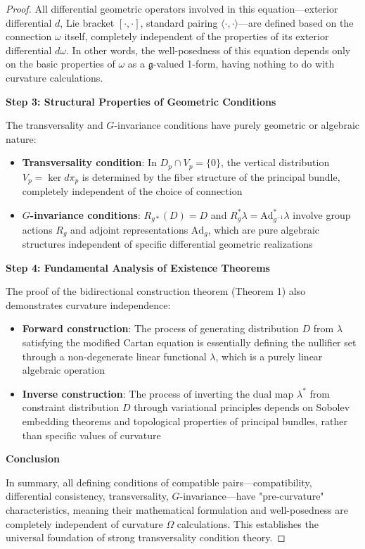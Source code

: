 \documentclass[a4paper,12pt]{extarticle}
\theoremstyle{definition}
\begin{document}
\begin{proof}
All differential geometric operators involved in this equation—exterior differential $d$, Lie bracket $[\cdot, \cdot]$, standard pairing $\langle \cdot, \cdot \rangle$—are defined based on the connection $\omega$ itself, completely independent of the properties of its exterior differential $d\omega$. In other words, the well-posedness of this equation depends only on the basic properties of $\omega$ as a $\mathfrak{g}$-valued 1-form, having nothing to do with curvature calculations.

\textbf{Step 3: Structural Properties of Geometric Conditions}

The transversality and $G$-invariance conditions have purely geometric or algebraic nature:
\begin{itemize}
\item \textbf{Transversality condition}: In $D_p \cap V_p = \{0\}$, the vertical distribution $V_p = \ker d\pi_p$ is determined by the fiber structure of the principal bundle, completely independent of the choice of connection
\item \textbf{$G$-invariance conditions}: $R_{g*}(D) = D$ and $R_g^* \lambda = \text{Ad}_{g^{-1}}^* \lambda$ involve group actions $R_g$ and adjoint representations $\text{Ad}_g$, which are pure algebraic structures independent of specific differential geometric realizations
\end{itemize}

\textbf{Step 4: Fundamental Analysis of Existence Theorems}

The proof of the bidirectional construction theorem (Theorem 1) also demonstrates curvature independence:
\begin{itemize}
\item \textbf{Forward construction}: The process of generating distribution $D$ from $\lambda$ satisfying the modified Cartan equation is essentially defining the nullifier set through a non-degenerate linear functional $\lambda$, which is a purely linear algebraic operation
\item \textbf{Inverse construction}: The process of inverting the dual map $\lambda^*$ from constraint distribution $D$ through variational principles depends on Sobolev embedding theorems and topological properties of principal bundles, rather than specific values of curvature
\end{itemize}

\textbf{Conclusion}

In summary, all defining conditions of compatible pairs—compatibility, differential consistency, transversality, $G$-invariance—have "pre-curvature" characteristics, meaning their mathematical formulation and well-posedness are completely independent of curvature $\Omega$ calculations. This establishes the universal foundation of strong transversality condition theory.
\end{proof}
\end{document}
